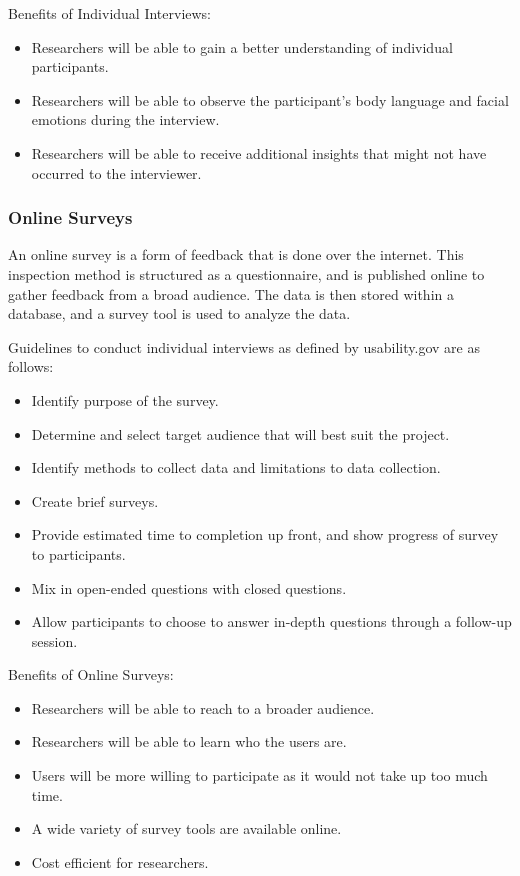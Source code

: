 \documentclass[10pt,journal,compsoc,draftclsnofoot]{IEEEtran}
\begin{document}
Benefits of Individual Interviews:
\begin{itemize}
\item Researchers will be able to gain a better understanding of individual participants.
\item Researchers will be able to observe the participant's body language and facial emotions during the interview.
\item Researchers will be able to receive additional insights that might not have occurred to the interviewer.
\end{itemize}

\subsubsection{Online Surveys} 
An online survey is a form of feedback that is done over the internet.
This inspection method is structured as a questionnaire, and is published online to gather feedback from a broad audience.
The data is then stored within a database, and a survey tool is used to analyze the data.

Guidelines to conduct individual interviews as defined by usability.gov are as follows:
\begin{itemize}
\item Identify purpose of the survey.
\item Determine and select target audience that will best suit the project.
\item Identify methods to collect data and limitations to data collection.
\item Create brief surveys.
\item Provide estimated time to completion up front, and show progress of survey to participants.
\item Mix in open-ended questions with closed questions.
\item Allow participants to choose to answer in-depth questions through a follow-up session.
\end{itemize}

Benefits of Online Surveys:
\begin{itemize}
\item Researchers will be able to reach to a broader audience.
\item Researchers will be able to learn who the users are.
\item Users will be more willing to participate as it would not take up too much time.
\item A wide variety of survey tools are available online.
\item Cost efficient for researchers.
\end{itemize}
\end{document}
